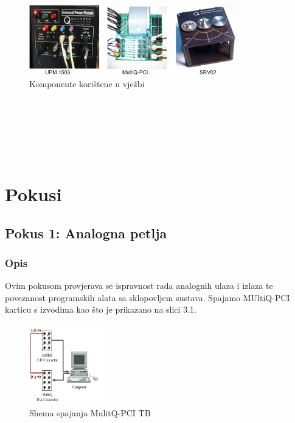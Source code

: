\documentclass[12pt,a4paper]{article}
\begin{document}
\begin{verbatim}







\end{verbatim}



\begin{figure}[h]
	\begin{center}
	\includegraphics[width=0.8\textwidth] {stuff.png}
    \caption{Komponente korištene u vježbi}
    \end{center}
\end{figure}

\begin{verbatim}






\end{verbatim}


\newpage

\section{Pokusi}
\subsection{Pokus 1: Analogna petlja}
\subsubsection{Opis}
Ovim pokusom provjerava se ispravnost rada analognih ulaza i izlaza te povezanost programskih alata sa sklopovljem sustava. 
\newline
Spajamo MUltiQ-PCI karticu s izvodima kao što je prikazano na slici 3.1.


\begin{figure}[h]
	\begin{center}
	\includegraphics[width=0.3\textwidth] {spoj1.png}
    \caption{Shema spajanja MulitQ-PCI TB}
    \end{center}
\end{figure}
\end{document}
